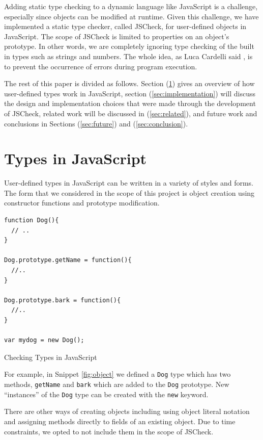 \documentclass{article}
\begin{document}
Adding static type checking to a dynamic language like JavaScript is a 
challenge, especially since objects can be modified at runtime. Given this challenge, 
we have implemented a static type checker, called JSCheck, for user-defined objects 
in JavaScript. The scope of JSCheck is limited to properties on an object's
prototype. In other words, we are completely ignoring type checking of the built in types
such as strings and numbers. The whole idea, as Luca Cardelli said \cite{typesystems}, 
is to prevent the occurrence of errors during program execution. 

The rest of this paper is divided as follows. Section (\ref{sec:types}) gives an overview
of how user-defined types work in JavaScript, section (\ref{sec:implementation}) 
will discuss the design and implementation choices that were made through the development 
of JSCheck, related work will be discussed in (\ref{sec:related}), and future work
and conclusions in Sections (\ref{sec:future}) and (\ref{sec:conclusion}).


\section{Types in JavaScript}
\label{sec:types}
User-defined types in JavaScript can be written in a variety of styles and forms. The form
that we considered in the scope of this project is object creation using 
constructor functions and prototype modification.

\begin{program}[here]
\begin{verbatim}
function Dog(){
  // ..
}

Dog.prototype.getName = function(){
  //..
}

Dog.prototype.bark = function(){
  //..
}

var mydog = new Dog();
\end{verbatim}
\caption{Checking Types in JavaScript}
\label{fig:object}
\end{program}
\pagebreak

For example, in Snippet \ref{fig:object} we defined a {\tt Dog} type
which has two methods, {\tt getName} and {\tt bark} which are added to the {\tt Dog}
prototype. New ``instances'' of the {\tt Dog} type can be created with the {\tt new}
keyword.

There are other ways of creating objects including using object literal notation
and assigning methods directly to fields of an existing object. Due to time constraints,
we opted to not include them in the scope of JSCheck.
\end{document}
